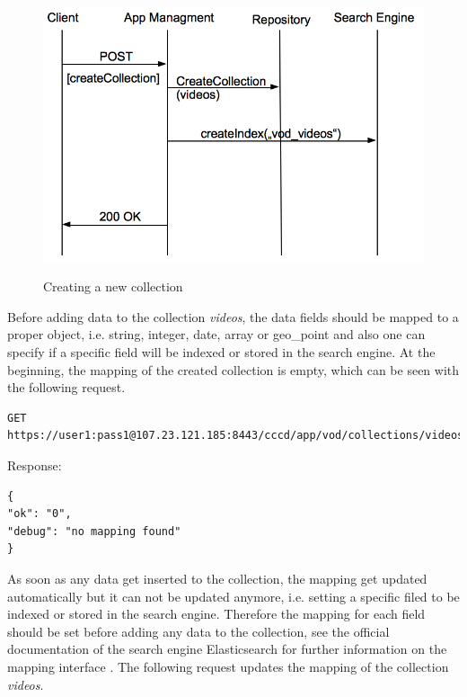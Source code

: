 \begin{figure}[htb]
  \centering
  \includegraphics[scale=0.6]{flows/newCollectionFlow.png}\\
  \caption{Creating a new collection}
  \label{fig:newCollection}
\end{figure}

Before adding data to the collection \textit{videos}, the data fields should be mapped to a proper object, i.e. string, integer, date, array or geo\_point and also one can specify if a specific field will be indexed or stored in the search engine. At the beginning, the mapping of the created collection is empty, which can be seen with the following request.

\begin{code}
\begin{verbatim}
GET https://user1:pass1@107.23.121.185:8443/cccd/app/vod/collections/videos/mapping
\end{verbatim}
Response:
\begin{verbatim}
{
"ok": "0",
"debug": "no mapping found"
}
\end{verbatim}
\end{code}

As soon as any data get inserted to the collection, the mapping get updated automatically but it can not be updated anymore, i.e. setting a specific filed to be indexed or stored in the search engine. Therefore the mapping for each field should be set before adding any data to the collection, see the official documentation of the search engine Elasticsearch for further information on the mapping interface \cite{elastic_mapping}. The following request updates the mapping of the collection \textit{videos}.

